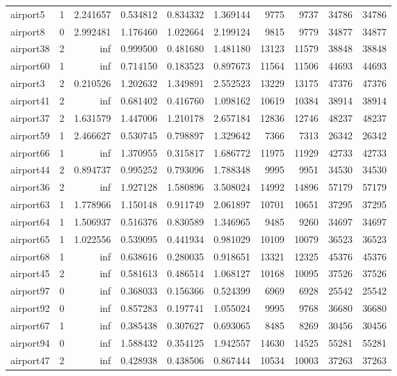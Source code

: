 \begin{longtable}{|l|r|r|r|r|r|r|r|r|r|}
airport5 & 1 & 2.241657 & 0.534812 & 0.834332 & 1.369144 & 9775 & 9737 & 34786 & 34786 \\
airport8 & 0 & 2.992481 & 1.176460 & 1.022664 & 2.199124 & 9815 & 9779 & 34877 & 34877 \\
airport38 & 2 & inf & 0.999500 & 0.481680 & 1.481180 & 13123 & 11579 & 38848 & 38848 \\
airport60 & 1 & inf & 0.714150 & 0.183523 & 0.897673 & 11564 & 11506 & 44693 & 44693 \\
airport3 & 2 & 0.210526 & 1.202632 & 1.349891 & 2.552523 & 13229 & 13175 & 47376 & 47376 \\
airport41 & 2 & inf & 0.681402 & 0.416760 & 1.098162 & 10619 & 10384 & 38914 & 38914 \\
airport37 & 2 & 1.631579 & 1.447006 & 1.210178 & 2.657184 & 12836 & 12746 & 48237 & 48237 \\
airport59 & 1 & 2.466627 & 0.530745 & 0.798897 & 1.329642 & 7366 & 7313 & 26342 & 26342 \\
airport66 & 1 & inf & 1.370955 & 0.315817 & 1.686772 & 11975 & 11929 & 42733 & 42733 \\
airport44 & 2 & 0.894737 & 0.995252 & 0.793096 & 1.788348 & 9995 & 9951 & 34530 & 34530 \\
airport36 & 2 & inf & 1.927128 & 1.580896 & 3.508024 & 14992 & 14896 & 57179 & 57179 \\
airport63 & 1 & 1.778966 & 1.150148 & 0.911749 & 2.061897 & 10701 & 10651 & 37295 & 37295 \\
airport64 & 1 & 1.506937 & 0.516376 & 0.830589 & 1.346965 & 9485 & 9260 & 34697 & 34697 \\
airport65 & 1 & 1.022556 & 0.539095 & 0.441934 & 0.981029 & 10109 & 10079 & 36523 & 36523 \\
airport68 & 1 & inf & 0.638616 & 0.280035 & 0.918651 & 13321 & 12325 & 45376 & 45376 \\
airport45 & 2 & inf & 0.581613 & 0.486514 & 1.068127 & 10168 & 10095 & 37526 & 37526 \\
airport97 & 0 & inf & 0.368033 & 0.156366 & 0.524399 & 6969 & 6928 & 25542 & 25542 \\
airport92 & 0 & inf & 0.857283 & 0.197741 & 1.055024 & 9995 & 9768 & 36680 & 36680 \\
airport67 & 1 & inf & 0.385438 & 0.307627 & 0.693065 & 8485 & 8269 & 30456 & 30456 \\
airport94 & 0 & inf & 1.588432 & 0.354125 & 1.942557 & 14630 & 14525 & 55281 & 55281 \\
airport47 & 2 & inf & 0.428938 & 0.438506 & 0.867444 & 10534 & 10003 & 37263 & 37263 \\

\end{longtable}
